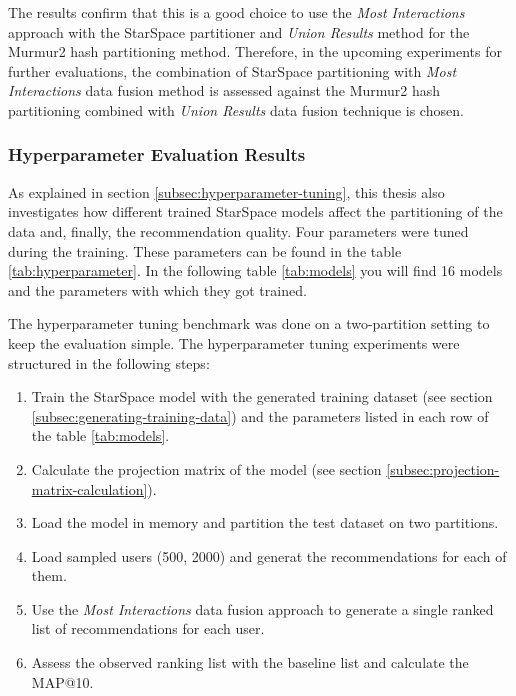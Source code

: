 The results confirm that this is a good choice to use the \emph{Most Interactions} approach with the StarSpace partitioner and \emph{Union Results} method for the Murmur2 hash partitioning method. Therefore, in the upcoming experiments for further evaluations, the combination of StarSpace partitioning with \emph{Most Interactions} data fusion method is assessed against the Murmur2 hash partitioning combined with \emph{Union Results} data fusion technique is chosen.


\subsubsection{Hyperparameter Evaluation Results}
\label{subsubsec:eval-hyperparameter}
As explained in section \ref{subsec:hyperparameter-tuning}, this thesis also investigates how different trained StarSpace models affect the partitioning of the data and, finally, the recommendation quality. Four parameters were tuned during the training. These parameters can be found in the table \ref{tab:hyperparameter}. In the following table \ref{tab:models} you will find 16 models and the parameters with which they got trained.


The hyperparameter tuning benchmark was done on a two-partition setting to keep the evaluation simple. The hyperparameter tuning experiments were structured in the following steps:

\begin{enumerate}
    \item Train the StarSpace model with the generated training dataset (see section \ref{subsec:generating-training-data}) and the parameters listed in each row of the table \ref{tab:models}.
    \item Calculate the projection matrix of the model (see section \ref{subsec:projection-matrix-calculation}).
    \item Load the model in memory and partition the test dataset on two partitions.
    \item Load sampled users (500, 2000) and generat the recommendations for each of them.
    \item Use the \emph{Most Interactions} data fusion approach to generate a single ranked list of recommendations for each user.
    \item Assess the observed ranking list with the baseline list and calculate the MAP@10.
\end{enumerate}


